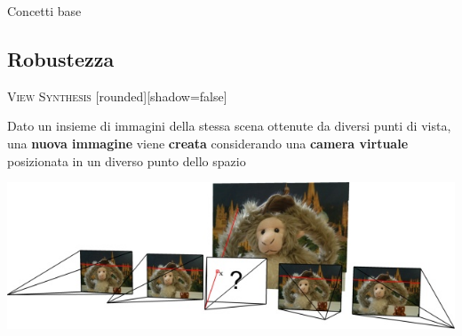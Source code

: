 \documentclass{beamer}
\begin{document}
\begin{section}{Concetti base}
\subsection{Robustezza}
\vspace{2em}
\begin{frame}[t]{\textsc{View Synthesis}}
	[rounded][shadow=false]
\begin{block}{}
\center \small{ Dato un insieme di immagini della stessa scena ottenute da diversi punti di vista, una \textbf{nuova immagine} viene \textbf{creata} considerando una \textbf{camera virtuale} posizionata in un diverso punto dello spazio}
\end{block}
\vspace{2em}
\centering
\includegraphics[width=1\linewidth]{./img/nvs.jpg}
\end{frame}


\end{section}
\end{document}
